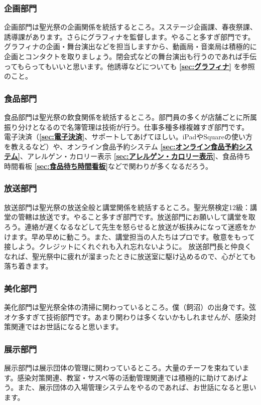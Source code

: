 \documentclass[dvipdfmx,jb5]{jarticle}
\begin{document}
\subsubsection{企画部門}
企画部門は聖光祭の企画関係を統括するところ。スステージ企画課、春夜祭課、誘導課があります。さらにグラフィナを監督します。やること多すぎ部門です。
グラフィナの企画・舞台演出などを担当しますから、動画局・音楽局は積極的に企画とコンタクトを取りましょう。閉会式などの舞台演出も行うのであれば手伝ってもらってもいいと思います。他誘導などについても {\bf \ref{sec:グラフィナ}} を参照のこと。

\subsubsection{食品部門}
食品部門は聖光祭の飲食関係を統括するところ。部門員の多くが店舗ごとに所属振り分けとなるので名簿管理は技術が行う。仕事多種多様複雑すぎ部門です。
電子決済（{\bf \ref{sec:電子決済}}、サポートしてあげてほしい。iPadやSquareの使い方を教えるなど）や、オンライン食品予約システム {\bf \ref{sec:オンライン食品予約システム}}、アレルゲン・カロリー表示 {\bf \ref{sec:アレルゲン・カロリー表示}}、食品待ち時間看板 {\bf \ref{sec:食品待ち時間看板}}などで関わりが多くなるだろう。

\subsubsection{放送部門}
放送部門は聖光祭の放送全般と講堂関係を統括するところ。聖光祭検定12級：講堂の管轄は放送です。やること多すぎ部門です。放送部門にお願いして講堂を取ろう。連絡が遅くなるなどして先生を怒らせると放送が板挟みになって迷惑をかけます。早め早めに動こう。また、講堂担当の人たちはプロです。敬意をもって接しよう。クレジットにくれぐれも入れ忘れないように。
放送部門長と仲良くなれば、聖光祭中に疲れが溜まったときに放送室に駆け込めるので、心がとても落ち着きます。

\subsubsection{美化部門}
美化部門は聖光祭全体の清掃に関わっているところ。僕（飼沼）の出身です。弦オケ多すぎて技術部門です。あまり関わりは多くないかもしれませんが、感染対策関連ではお世話になると思います。

\subsubsection{展示部門}
展示部門は展示団体の管理に関わっているところ。大量のチーフを束ねています。感染対策関連、教室・サスペ等の活動管理関連では積極的に助けてあげよう。また、展示団体の入場管理システムをやるのであれば、お世話になると思います。
\end{document}
